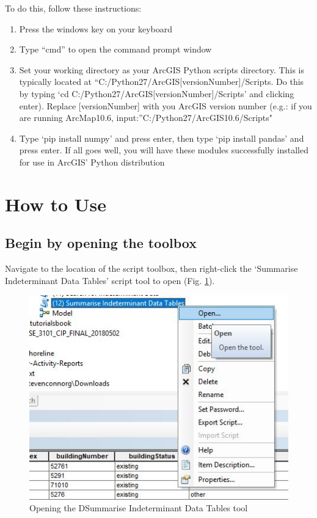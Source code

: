 \documentclass[openany]{book}
\providecommand{\tightlist}{%
  \setlength{\itemsep}{0pt}\setlength{\parskip}{0pt}}
\theoremstyle{definition}
\theoremstyle{definition}
\theoremstyle{definition}
\theoremstyle{remark}
\begin{document}
To do this, follow these instructions:

\begin{enumerate}
\def\labelenumi{\arabic{enumi}.}
\tightlist
\item
  Press the windows key on your keyboard
\item
  Type ``cmd'' to open the command prompt window
\item
  Set your working directory as your ArcGIS Python scripts directory.
  This is typically located at
  ``C:/Python27/ArcGIS{[}versionNumber{]}/Scripts. Do this by typing `cd
  C:/Python27/ArcGIS{[}versionNumber{]}/Scripts' and clicking enter).
  Replace {[}versionNumber{]} with you ArcGIS version number (e.g.: if
  you are running ArcMap10.6, input:''C:/Python27/ArcGIS10.6/Scripts"
\item
  Type `pip install numpy' and press enter, then type `pip install
  pandas' and press enter. If all goes well, you will have these modules
  successfully installed for use in ArcGIS' Python distribution
\end{enumerate}

\section{How to Use}\label{how-to-use-8}

\subsection{Begin by opening the
toolbox}\label{begin-by-opening-the-toolbox-8}

Navigate to the location of the script toolbox, then right-click the
`Summarise Indeterminant Data Tables' script tool to open (Fig.
\ref{fig:summIndtopen}).

\begin{figure}[H]

{\centering \includegraphics{figures/summIndt-open} 

}

\caption{Opening the DSummarise Indeterminant Data Tables tool}\label{fig:summIndtopen}
\end{figure}
\end{document}
